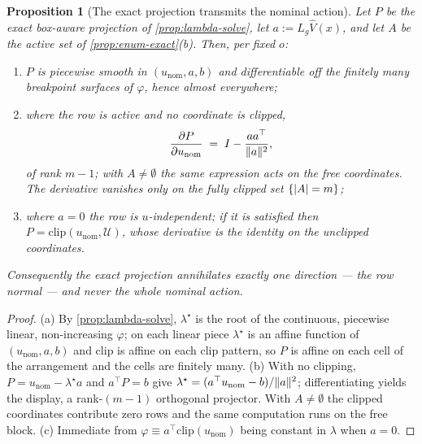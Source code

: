 \documentclass[11pt]{article}
\theoremstyle{plain}
\newtheorem{proposition}[theorem]{Proposition}
\theoremstyle{definition}
\theoremstyle{remark}
\DeclarePairedDelimiter{\norm}{\lVert}{\rVert}
\DeclarePairedDelimiter{\abs}{\lvert}{\rvert}
\newcommand{\calU}{\mathcal{U}}
\newcommand{\Vhat}{\widehat V}
\newcommand{\Lg}{L_g}
\newcommand{\eqdef}{:=}
\begin{document}
\begin{proposition}[The exact projection transmits the nominal action]\label{prop:jt}
Let $P$ be the exact box-aware projection of \cref{prop:lambda-solve}, let $a\eqdef\Lg\Vhat(x)$,
and let $A$ be the active set of \cref{prop:enum-exact}(b). Then, per fixed $o$:
\begin{enumerate}[label=(\alph*)]
  \item $P$ is piecewise smooth in $(u_{\mathrm{nom}},a,b)$ and differentiable off the finitely
  many breakpoint surfaces of $\varphi$, hence almost everywhere;
  \item where the row is active and no coordinate is clipped,
  \begin{equation}
  \frac{\partial P}{\partial u_{\mathrm{nom}}}\;=\;I-\frac{aa^\top}{\norm a^2},
  \end{equation}
  of rank $m-1$; with $A\neq\emptyset$ the same expression acts on the free coordinates. The
  derivative vanishes only on the fully clipped set $\{\abs A=m\}$;
  \item where $a=0$ the row is $u$-independent; if it is satisfied then
  $P=\mathrm{clip}(u_{\mathrm{nom}},\calU)$, whose derivative is the identity on the unclipped
  coordinates.
\end{enumerate}
Consequently the exact projection annihilates exactly one direction --- the row normal --- and
never the whole nominal action.
\end{proposition}
\begin{proof}
(a) By \cref{prop:lambda-solve}, $\lambda^\star$ is the root of the continuous, piecewise
linear, non-increasing $\varphi$; on each linear piece $\lambda^\star$ is an affine function of
$(u_{\mathrm{nom}},a,b)$ and $\mathrm{clip}$ is affine on each clip pattern, so $P$ is affine on
each cell of the arrangement and the cells are finitely many.
(b) With no clipping, $P=u_{\mathrm{nom}}-\lambda^\star a$ and $a^\top P=b$ give
$\lambda^\star=(a^\top u_{\mathrm{nom}}-b)/\norm a^2$; differentiating yields the display, a
rank-$(m-1)$ orthogonal projector. With $A\neq\emptyset$ the clipped coordinates contribute
zero rows and the same computation runs on the free block.
(c) Immediate from $\varphi\equiv a^\top\mathrm{clip}(u_{\mathrm{nom}})$ being constant in
$\lambda$ when $a=0$.
\end{proof}
\end{document}
